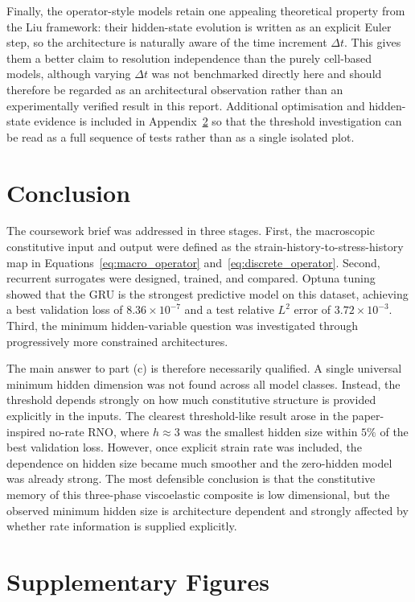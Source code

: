 \documentclass[11pt,a4paper]{article}
\newcommand{\dt}{\Delta t}
\begin{document}
Finally, the operator-style models retain one appealing theoretical property from the Liu framework: their hidden-state evolution is written as an explicit Euler step, so the architecture is naturally aware of the time increment $\dt$. This gives them a better claim to resolution independence than the purely cell-based models, although varying $\dt$ was not benchmarked directly here and should therefore be regarded as an architectural observation rather than an experimentally verified result in this report. Additional optimisation and hidden-state evidence is included in Appendix~\ref{appendix:supplementary_figures} so that the threshold investigation can be read as a full sequence of tests rather than as a single isolated plot.

\section{Conclusion}

The coursework brief was addressed in three stages. First, the macroscopic constitutive input and output were defined as the strain-history-to-stress-history map in Equations~\eqref{eq:macro_operator} and~\eqref{eq:discrete_operator}. Second, recurrent surrogates were designed, trained, and compared. Optuna tuning showed that the GRU is the strongest predictive model on this dataset, achieving a best validation loss of $8.36\times 10^{-7}$ and a test relative $L^2$ error of $3.72\times 10^{-3}$. Third, the minimum hidden-variable question was investigated through progressively more constrained architectures.

The main answer to part (c) is therefore necessarily qualified. A single universal minimum hidden dimension was not found across all model classes. Instead, the threshold depends strongly on how much constitutive structure is provided explicitly in the inputs. The clearest threshold-like result arose in the paper-inspired no-rate RNO, where $h\approx 3$ was the smallest hidden size within $5\%$ of the best validation loss. However, once explicit strain rate was included, the dependence on hidden size became much smoother and the zero-hidden model was already strong. The most defensible conclusion is that the constitutive memory of this three-phase viscoelastic composite is low dimensional, but the observed minimum hidden size is architecture dependent and strongly affected by whether rate information is supplied explicitly.

\appendix
\section{Supplementary Figures}
\label{appendix:supplementary_figures}
\end{document}
